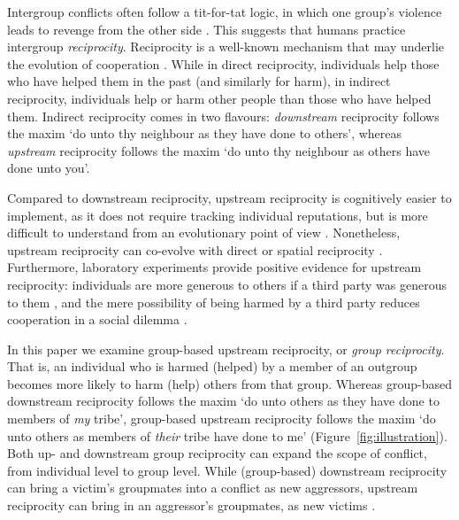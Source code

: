 \documentclass[12pt,a4paper]{article}\usepackage[]{graphicx}\usepackage[]{color}
\begin{document}
Intergroup conflicts often follow a tit-for-tat logic, in which one group's
violence leads to revenge from the other side
\citep{horowitz2001thedeadly,horowitz1985ethnicgroups,chagnon1988lifehistories,haushofer_both_2010,shayo2010judicial}.
This suggests that humans practice intergroup \emph{reciprocity}. Reciprocity is
a well-known mechanism that may underlie the evolution of cooperation
\citep{nowak2006five,nowak2012evolving}. While in direct reciprocity,
individuals help those who have helped them in the past (and similarly for
harm), in indirect reciprocity, individuals help or harm other people than those
who have helped them.  Indirect reciprocity comes in two flavours:
\emph{downstream} reciprocity follows the maxim `do unto thy neighbour as they
have done to others', whereas \emph{upstream} reciprocity follows the maxim `do
unto thy neighbour as others have done unto you'. 

Compared to downstream reciprocity, upstream reciprocity is cognitively easier to
implement, as it does not require tracking individual reputations, but is more
difficult to understand from an evolutionary point of view
\citep{boyd1989evolution,nowak2005evolution}. Nonetheless, upstream reciprocity
can co-evolve with direct or spatial reciprocity \citep{nowak2007upstream}.
Furthermore, laboratory experiments provide positive evidence for upstream
reciprocity: individuals are more generous to others if a third party was
generous to them \citep{dufwenberg2001direct,guth2001trust,greiner2005indirect},
and the mere possibility of being harmed by a third party reduces cooperation in
a social dilemma \citep{weisel2016social}.

In this paper we examine
group-based upstream reciprocity, or \emph{group reciprocity}. That is, an
individual who is harmed (helped) by a member of an outgroup becomes more likely
to harm (help) others from that group.  Whereas group-based downstream
reciprocity \citep{bernhard2006group,bernhard2006parochial} follows the maxim
`do unto others as they have done to members of \emph{my} tribe', group-based
upstream reciprocity follows the maxim `do unto others as members of
\emph{their} tribe have done to me' (Figure~\ref{fig:illustration}).
%
Both up- and downstream group reciprocity can  expand the scope of conflict, 
from individual level to group level. While (group-based)
downstream reciprocity can bring a victim’s groupmates into a conflict 
as new aggressors, upstream reciprocity can bring in an aggressor’s groupmates, as new victims 
\citep{Pietraszewski2016470}.
\end{document}

